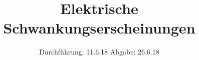 

\subject{V 57}
\title{Elektrische Schwankungserscheinungen}
\date{
  Durchführung: 11.6.18
  \hspace{3em}
  Abgabe: 26.6.18
}



\maketitle
\thispagestyle{empty}
\tableofcontents
\newpage











